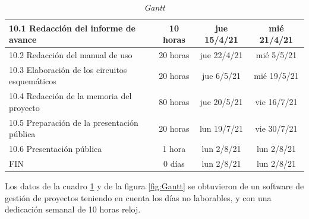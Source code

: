 \documentclass[11pt]{charter}
\begin{document}
\begin{table}[htbp]
{\begin{tabular}{|p{25em}|c|c|c|}
\hline 10.1 Redacción del informe de avance & 10 horas & jue 15/4/21 & mié 21/4/21 \\
\hline 10.2 Redacción del manual de uso & 20 horas & jue 22/4/21 & mié 5/5/21 \\
\hline 10.3 Elaboración de los circuitos esquemáticos & 20 horas & jue 6/5/21 & mié 19/5/21 \\
\hline 10.4 Redacción de la memoria del proyecto & 80 horas & jue 20/5/21 & vie 16/7/21 \\
\hline 10.5 Preparación de la presentación pública & 20 horas & lun 19/7/21 & vie 30/7/21 \\
\hline 10.6 Presentación pública & 1 hora & lun 2/8/21 & lun 2/8/21 \\
\hline FIN   & 0 días & lun 2/8/21 & lun 2/8/21 \\
\hline
\end{tabular}}
\caption{\textit{Gantt}}
\label{tab:CuadroGantt}
\end{table}

Los datos de la cuadro \ref{tab:CuadroGantt} y de la figura \ref{fig:Gantt} se obtuvieron de un software de gestión de proyectos teniendo en cuenta los días no laborables, y con una dedicación semanal de 10 horas reloj.  



\end{document}

